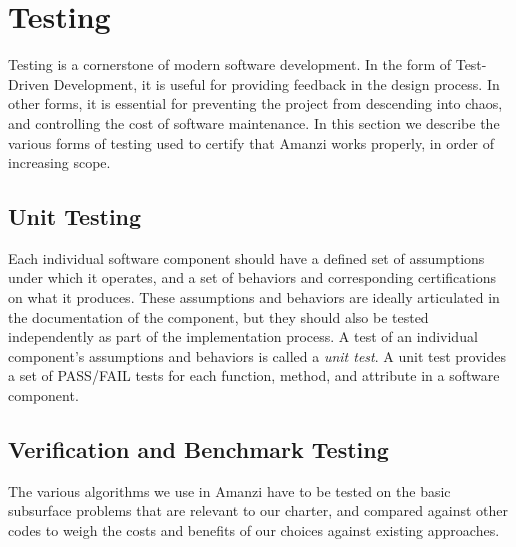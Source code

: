 %
%

\section{Testing}

Testing is a cornerstone of modern software development. In the form of Test-Driven
Development, it is useful for providing feedback in the design process. In other 
forms, it is essential for preventing the project from descending into chaos, and 
controlling the cost of software maintenance. In this section we describe the 
various forms of testing used to certify that Amanzi works properly, in order of 
increasing scope.


\subsection{Unit Testing}

Each individual software component should have a defined set of assumptions under 
which it operates, and a set of behaviors and corresponding certifications on 
what it produces. These assumptions and behaviors are ideally articulated in the 
documentation of the component, but they should also be tested independently as part
of the implementation process. A test of an individual component's assumptions and 
behaviors is called a {\em unit test}. A unit test provides a set of PASS/FAIL tests for 
each function, method, and attribute in a software component.


\subsection{Verification and Benchmark Testing}

The various algorithms we use in Amanzi have to be tested on the basic subsurface 
problems that are relevant to our charter, and compared against other codes to 
weigh the costs and benefits of our choices against existing approaches. 

